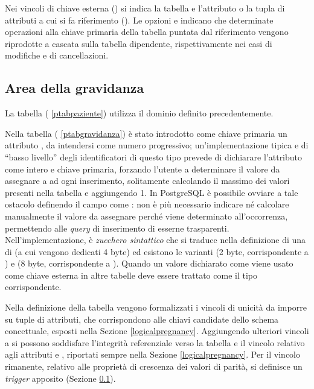 Nei vincoli di chiave esterna () si indica la tabella e l'attributo o la tupla di attributi a cui si fa riferimento ().
Le opzioni  e  indicano che determinate operazioni alla chiave primaria della tabella puntata dal riferimento vengono riprodotte a cascata sulla tabella dipendente, rispettivamente nei casi di modifiche e di cancellazioni.

\subsection{Area della gravidanza}

La tabella  (\lstlistingname{} \ref{ptabpaziente}) utilizza il dominio  definito precedentemente.

Nella tabella  (\lstlistingname{} \ref{ptabgravidanza}) è stato introdotto come chiave primaria un attributo , da intendersi come numero progressivo; un'implementazione tipica e di \enquote{basso livello} degli identificatori di questo tipo prevede di dichiarare l'attributo come intero e chiave primaria, forzando l'utente a determinare il valore da assegnare a  ad ogni inserimento, solitamente calcolando il massimo dei valori  presenti nella tabella e aggiungendo 1.
In PostgreSQL \cite{Pos25} è possibile ovviare a tale ostacolo definendo il campo  come : non è più necessario indicare né calcolare manualmente il valore  da assegnare perché viene determinato all'occorrenza, permettendo alle \emph{query} di inserimento di esserne trasparenti.
Nell'implementazione,  è \emph{zucchero sintattico} che si traduce nella definizione di una  di  (a cui vengono dedicati 4 byte) ed esistono le varianti  (2 byte, corrispondente a ) e  (8 byte, corrispondente a ).
Quando un valore dichiarato come  viene usato come chiave esterna in altre tabelle deve essere trattato come il tipo  corrispondente.

Nella definizione della tabella  vengono formalizzati i vincoli di unicità da imporre su tuple di attributi, che corrispondono alle chiavi candidate dello schema concettuale, esposti nella Sezione \ref{logicalpregnancy}.
Aggiungendo ulteriori vincoli a  si possono soddisfare l'integrità referenziale verso la tabella  e il vincolo relativo agli attributi  e , riportati sempre nella Sezione \ref{logicalpregnancy}.
Per il vincolo rimanente, relativo alle proprietà di crescenza dei valori di parità, si definisce un \emph{trigger} apposito (Sezione \ref{}).

